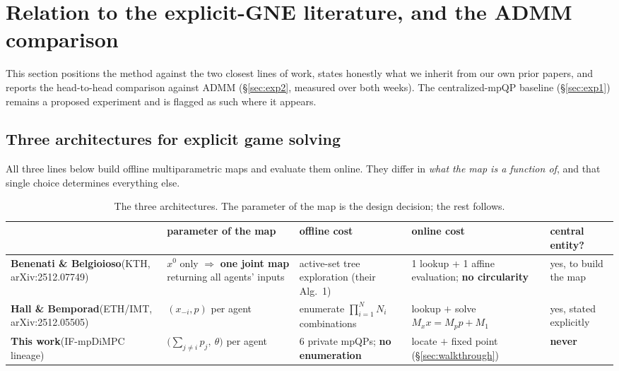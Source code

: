 \documentclass[11pt, letterpaper]{article}
\begin{document}
\section{Relation to the explicit-GNE literature, and the ADMM comparison}\label{sec:related}
This section positions the method against the two closest lines of work, states honestly what we
inherit from our own prior papers, and reports the head-to-head comparison against ADMM
(\S\ref{sec:exp2}, measured over both weeks). The centralized-mpQP baseline (\S\ref{sec:exp1})
remains a proposed experiment and is flagged as such where it appears.

\subsection{Three architectures for explicit game solving}
All three lines below build offline multiparametric maps and evaluate them online. They differ in
\emph{what the map is a function of}, and that single choice determines everything else.

\begin{table}[H]\centering\small
\begin{tabular}{p{3.1cm}p{3.3cm}p{2.9cm}p{2.6cm}p{2.2cm}}
\toprule
& parameter of the map & offline cost & online cost & central entity?\\
\midrule
\textbf{Benenati \& Belgioioso}\newline (KTH, arXiv:2512.07749) &
$x^0$ only $\Rightarrow$ \textbf{one joint map} returning all agents' inputs &
active-set tree exploration (their Alg.~1) &
1 lookup + 1 affine evaluation; \textbf{no circularity} &
yes, to build the map\\
\addlinespace
\textbf{Hall \& Bemporad}\newline (ETH/IMT, arXiv:2512.05505) &
$(x_{-i},p)$ per agent &
enumerate $\prod_{i=1}^N N_i$ combinations &
lookup $+$ solve $M_xx=M_pp+M_1$ &
yes, stated explicitly\\
\addlinespace
\textbf{This work}\newline (IF-mpDiMPC lineage) &
$\bigl(\sum_{j\ne i}p_j,\ \theta\bigr)$ per agent &
$6$ private mpQPs; \textbf{no enumeration} &
locate $+$ fixed point (\S\ref{sec:walkthrough}) &
\textbf{never}\\
\bottomrule
\end{tabular}
\caption{The three architectures. The parameter of the map is the design decision; the rest follows.}
\label{tab:arch}
\end{table}
\end{document}
